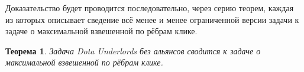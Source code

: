\documentclass{article}
\newtheorem{theorem}{Теорема}
\begin{document}
Доказательство будет проводится последовательно, через серию теорем, каждая из которых описывает сведение всё менее и менее ограниченной версии задачи к задаче о максимальной взвешенной по рёбрам клике.


%
%
%

\begin{theorem}
    Задача Dota Underlords без альянсов сводится к задаче о максимальной взвешенной по рёбрам клике.
    \label{trivial_case}
\end{theorem}
\end{document}
